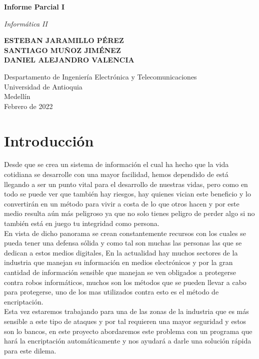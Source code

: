 \documentclass{article}
\begin{document}
\begin{titlepage}
    \begin{center}
        \vspace*{1cm}
        
        \Huge
        \textbf{Informe Parcial I}
            
        \vspace{0.5cm}
        \LARGE
       \textit{ Informática II}
            
        \vspace{1.5cm}
            
        \textbf{ESTEBAN JARAMILLO PÉREZ\\
        SANTIAGO MUÑOZ JIMÉNEZ\\
        DANIEL ALEJANDRO VALENCIA}
            
        \vfill
            
        \vspace{0.8cm}
            
        \Large
        Despartamento de Ingeniería Electrónica y Telecomunicaciones\\
        Universidad de Antioquia\\
        Medellín\\
        Febrero de 2022
            
    \end{center}
\end{titlepage}

\tableofcontents
\newpage
\newpage
\section{Introducción}
\label{Introducción}
Desde que se crea un sistema de información el cual ha hecho que la vida cotidiana se desarrolle con una mayor facilidad, hemos dependido de está llegando a ser un punto vital para el desarrollo de nuestras vidas, pero como en todo se puede ver que también hay riesgos, hay quienes vician este beneficio y lo convertirán en un método para vivir a costa de lo que otros hacen y por este medio resulta aún más peligroso ya que no solo tienes peligro de perder algo si no también está en juego tu integridad como persona.\\
\newline
En vista de dicho panorama se crean constantemente recursos con los cuales se pueda tener una defensa sólida y como tal son muchas las personas las que se dedican a estos medios digitales,
En la actualidad hay muchos sectores de la industria que manejan su información en medios electrónicos y por la gran cantidad de información sensible que manejan se ven obligados a protegerse contra robos informáticos, muchos son los métodos que se pueden llevar a cabo para protegerse, uno de los mas utilizados contra esto es el método de encriptación.\\
\newline
Esta vez estaremos trabajando para una de las zonas de la industria que es más sensible a este tipo de ataques y por tal requieren una mayor seguridad y estos son lo bancos, en este proyecto abordaremos este problema con un programa que hará la encriptación automáticamente y nos ayudará a darle una solución rápida para este dilema.
\end{document}
